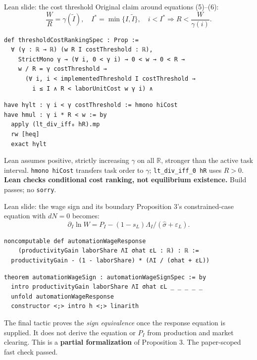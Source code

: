\documentclass[aspectratio=169,11pt]{beamer}
\newcommand{\key}[1]{{\color{accent}\bfseries #1}}
\begin{document}
\begin{frame}[fragile]{Lean slide: the cost threshold}
\small Original claim around equations (5)--(6):
\[
\frac{W}{R}=\gamma(\widetilde I),\quad I^*=\min\{I,\widetilde I\},\quad
 i<I^*\Rightarrow R<\frac{W}{\gamma(i)}.
\]
\begin{lstlisting}
def thresholdCostRankingSpec : Prop :=
  ∀ (γ : ℝ → ℝ) (w R I costThreshold : ℝ),
    StrictMono γ → (∀ i, 0 < γ i) → 0 < w → 0 < R →
    w / R = γ costThreshold →
      (∀ i, i < implementedThreshold I costThreshold →
        i ≤ I ∧ R < laborUnitCost w γ i) ∧
\end{lstlisting}
\begin{lstlisting}
have hγlt : γ i < γ costThreshold := hmono hiCost
have hmul : γ i * R < w := by
  apply (lt_div_iff₀ hR).mp
  rw [heq]
  exact hγlt
\end{lstlisting}
\scriptsize Lean assumes positive, strictly increasing $\gamma$ on all $\mathbb R$, stronger than the active task interval. \texttt{hmono hiCost} transfers task order to $\gamma$; \texttt{lt\_div\_iff\_0 hR} uses $R>0$. \key{Lean checks conditional cost ranking, not equilibrium existence.} Build passes; no \texttt{sorry}.
\end{frame}

\begin{frame}[fragile]{Lean slide: the wage sign and its boundary}
\small Proposition 3's constrained-case equation with $dN=0$ becomes:
\[
\partial_I\ln W=P_I-(1-s_L)\Lambda_I/(\widehat\sigma+\varepsilon_L).
\]
\begin{lstlisting}
noncomputable def automationWageResponse
    (productivityGain laborShare ΛI σhat εL : ℝ) : ℝ :=
  productivityGain - (1 - laborShare) * (ΛI / (σhat + εL))
\end{lstlisting}
\begin{lstlisting}
theorem automationWageSign : automationWageSignSpec := by
  intro productivityGain laborShare ΛI σhat εL _ _ _ _ _
  unfold automationWageResponse
  constructor <;> intro h <;> linarith
\end{lstlisting}
\small The final tactic proves the \emph{sign equivalence} once the response equation is supplied. It does not derive the equation or $P_I$ from production and market clearing. This is a \key{partial formalization} of Proposition 3. The paper-scoped fast check passed.
\end{frame}
\end{document}
